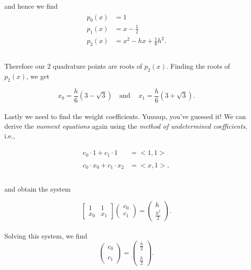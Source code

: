 \documentclass[paper=a4, fontsize=11pt]{scrartcl} %
\numberwithin{equation}{section} %
\numberwithin{figure}{section} %
\numberwithin{table}{section} %
\begin{document}
and hence we find\\

\begin{align}
\nonumber
\begin{split}
p_0(x) &= 1 \\ 
p_1(x) &= x - \frac{1}{2} \\
p_2(x) &= x^2 - hx + \frac{1}{6} h^2. \\ \\
\end{split}
\end{align}

Therefore our $2$ quadrature points are roots of $p_2(x)$. Finding the roots of $p_2(x)$, we get 

$$x_{0} = \frac{h}{6}(3-\sqrt{3}) \ \ \ \mbox{ and } \ \ \ \ x_1 = \frac{h}{6}(3+\sqrt{3}).$$\\

Lastly we need to find the weight coefficients. Yuuuup, you've guessed it! We can derive the \emph{moment equations} again using the \emph{method of undetermined coefficients}, i.e.,

\begin{align}
\nonumber
\begin{split}
c_0\cdot 1      + c_1 \cdot 1       &= <1,1>  \\ \\
c_0\cdot x_0  + c_1 \cdot x_2   &= <x,1>,  \\ \\
\end{split}
\end{align}

and obtain the system

$$\left[ \begin{array}{cc}
1      &   1   \\ 
x_0  & x_1 \end{array} \right] 
%
\left(\begin{array}{c}
c_0 \\
c_1 \end{array}\right) = 
%
\left(\begin{array}{c}
h \\
\frac{h^2}{2} \end{array}\right).$$\\
 
Solving this system, we find \\

$$\left( \begin{array}{cc}
c_0 \\ \\
c_1 \end{array}\right) = 
%
\left(\begin{array}{c}
\frac{h}{2} \\ \\
\frac{h}{2} \end{array}\right).$$\\
 
\end{document}
